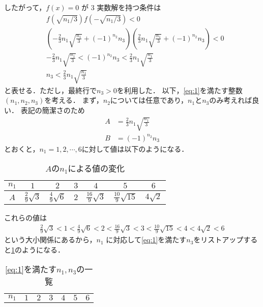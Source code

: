 \documentclass[a4paper,10pt]{ltjsarticle}
\begin{document}
\begin{multicols}{2}
  したがって，$f(x)=0$ が $3$ 実数解を持つ条件は
  \begin{align}
     & f(\sqrt{n_1/3}) f(-\sqrt{n_1/3}) < 0                                                                          \nonumber                        \\
     & \left(-\frac{2}{3}n_1\sqrt{\frac{n_1}{3}} + (-1)^{n_2}n_3\right) \left(\frac{2}{3}n_1\sqrt{\frac{n_1}{3}} + (-1)^{n_2}n_3\right) < 0 \nonumber \\
     & -\frac{2}{3}n_1\sqrt{\frac{n_1}{3}} <(-1)^{n_2}n_3 < \frac{2}{3}n_1\sqrt{\frac{n_1}{3}}                          \nonumber                     \\
     & n_3 < \frac{2}{3}n_1\sqrt{\frac{n_1}{3}} \label{eq:1}
  \end{align}
  と表せる．ただし，最終行で$n_3>0$を利用した．
  以下，\cref{eq:1}を満たす整数$(n_1,n_2,n_3)$を考える．
  まず，$n_2$については任意であり，$n_1$と$n_3$のみ考えれば良い．
  表記の簡潔さのため
  \begin{align*}
    A & = \frac{2}{3}n_1\sqrt{\frac{n_1}{3}} \\
    B & = (-1)^{n_2}n_3
  \end{align*}
  とおくと，$n_1=1,2,\cdots,6$に対して値は以下のようになる．
  \begin{table}[H]
    \centering
    \caption{$A$の$n_1$による値の変化}
    \begin{tabular}{|c||c|c|c|c|c|c|}
      \hline
      $n_1$ & $1$                   & $2$                   & $3$ & $4$                    & $5$                     & $6$         \\
      \hline
      $A$   & $\frac{2}{9}\sqrt{3}$ & $\frac{4}{9}\sqrt{6}$ & $2$ & $\frac{16}{9}\sqrt{3}$ & $\frac{10}{9}\sqrt{15}$ & $4\sqrt{2}$ \\
      \hline
    \end{tabular}
  \end{table}
  これらの値は
  \begin{align*}
    \frac{2}{9}\sqrt{3} < 1 < \frac{4}{9}\sqrt{6} < 2 < \frac{16}{9}\sqrt{3} < 3 < \frac{10}{9}\sqrt{15} < 4 < 4\sqrt{2} < 6
  \end{align*}
  という大小関係にあるから，$n_1$ に対応して\cref{eq:1}を満たす$n_3$をリストアップすると\cref{table:2}のようになる．
  \begin{table}[H]
    \centering
    \caption{\cref{eq:1}を満たす$n_1,n_3$の一覧}
    \label{table:2}
    \begin{tabular}{|c||c|c|c|c|c|c|}
      \hline
      $n_1$   & $1$ & $2$ & $3$ & $4$        & $5$        & $6$        \\

\end{tabular}
\end{table}
\end{multicols}
\end{document}
